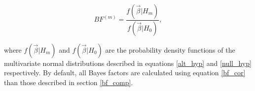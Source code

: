 \documentclass{article}
\begin{document}
\begin{equation}
\label{bf_cor}
BF^{(m)} = \frac{f(\vec{\beta}| H_m)}{f(\vec{\beta}| H_0)},
\end{equation}

\noindent where $f(\vec{\beta}| H_m)$ and $f(\vec{\beta}| H_0)$ are the probability density functions of the multivariate normal distributions described in equations \ref{alt_hyp} and \ref{null_hyp} respectively. By default, all Bayes factors are calculated using equation \ref{bf_cor} than those described in section \ref{bf_comp}.




\end{document}
